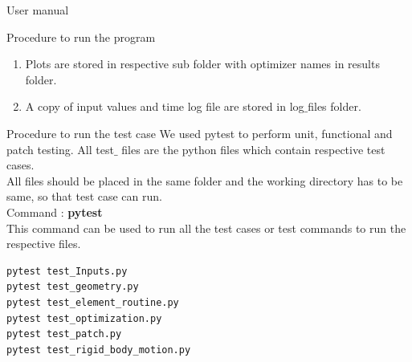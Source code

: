 \documentclass[a4paper,12pt,times]{article}
\begin{document}
\begin{section}{User manual}
\begin{subsection}{Procedure to run the program}
\begin{enumerate}
\begin{lstlisting}
Option :
0- Cantilever beam with load along the bottom edge of the free end.
1- Simple supported with point load at bottom center.
2- Cantilever beam with point load at bottom of the free end.
3- Cantilever beam with point load at the free end (2d case loading at y=height and x=length).
4- Cantilever beam with two forces at top and bottom of the free end .
5- Cantilever beam with point load at the center of the free end.
6- Simple supported with load at top center.
    \end{lstlisting}
Optimizer option (Ft$\_$op):\\
    \begin{lstlisting}
Option :
0-OC (optimality criterion)

1-MMA (method of moving asymptotes)
    \end{lstlisting}
 Verbose:\\
     \begin{lstlisting}
Option :
0-Will not print plots using pyvista only VTK file is generated.

1- Plots are generated and stored in results folder.
    \end{lstlisting}
\item Plots are stored in respective sub folder with optimizer names in results folder.

\item A copy of input values and time log file are stored in log$\_$files folder.
\end{enumerate}
\end{subsection}
\begin{subsection}{Procedure to run the test case}
We used pytest to perform unit, functional and patch testing. All test$\_$ files are the python files which contain respective test cases.\\
All files should be placed in the same folder and the working directory has to be same, so that test case can run.\\
Command : \textbf{pytest}\\
This command can be used to run all the test cases or
test commands to run the respective files.
\begin{lstlisting}
pytest test_Inputs.py
pytest test_geometry.py
pytest test_element_routine.py
pytest test_optimization.py
pytest test_patch.py
pytest test_rigid_body_motion.py
\end{lstlisting}
\end{subsection}
\newpage
\end{section}
\end{document}
